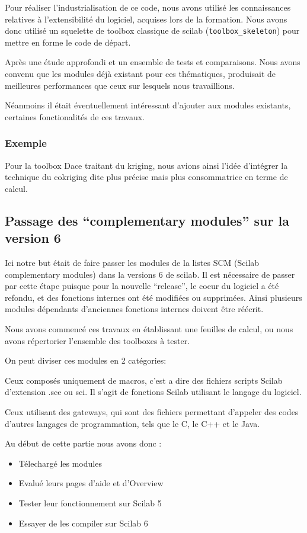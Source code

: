 Pour réaliser l’industrialisation de ce code,
nous avons utilisé les connaissances relatives à
l’extensibilité du logiciel, acquises lors de la formation.
Nous avons donc utilisé un squelette de toolbox classique
de scilab ({\tt toolbox\_skeleton}) pour mettre en forme
le code de départ.

Après une étude approfondi et un ensemble de tests et comparaisons.
Nous avons convenu que les modules déjà existant pour ces thématiques,
produisait de meilleures performances que ceux sur lesquels nous travaillions.

Néanmoins il était éventuellement intéressant d’ajouter aux modules existants,
certaines fonctionalités de ces travaux.

\subsubsection*{Exemple}
Pour la toolbox Dace traitant du kriging, nous avions ainsi l’idée d'intégrer
la technique du cokriging dite plus précise mais plus consommatrice en terme de calcul.

\subsection*{Passage des ``complementary modules'' sur la version 6}

Ici notre but était de faire passer les modules de la listes SCM (Scilab complementary modules) dans la versions 6 de scilab. Il est nécessaire de passer par cette étape puisque pour la nouvelle “release”, le coeur du logiciel a été refondu, et des fonctions internes ont été modifiées ou supprimées. Ainsi plusieurs modules dépendants d’anciennes fonctions internes doivent être réécrit.

Nous avons commencé ces travaux en établissant une feuilles de calcul, ou nous avons répertorier l’ensemble des toolboxes à tester.

On peut diviser ces modules en 2 catégories:

Ceux composés uniquement de macros, c’est a dire des fichiers scripts Scilab d’extension .sce ou sci. Il s’agit de fonctions Scilab utilisant le langage du logiciel.

Ceux utilisant des gateways, qui sont des fichiers permettant d’appeler des codes d’autres langages de programmation, tels que le C, le C++ et le Java.

Au début de cette partie nous avons donc :

\begin{itemize}
\item Télechargé les modules
\item Evalué leurs pages d’aide et d’Overview
\item Tester leur fonctionnement sur Scilab 5
\item Essayer de les compiler sur Scilab 6
\end{itemize}

